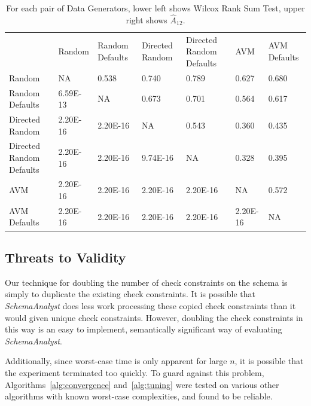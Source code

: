 \begin{table}[h]
\begin{tabular}{lllllll}
                         & Random   & Random Defaults & Directed Random & Directed Random Defaults & AVM      & AVM Defaults \\
Random                   & NA       & 0.538
&\cellcolor{gray!65} 0.740           &\cellcolor{gray!65} 0.789
&\cellcolor{gray!25} 0.627    &\cellcolor{gray!45} 0.680        \\
Random Defaults          & 6.59E-13 & NA              &
\cellcolor{gray!45}0.673           &\cellcolor{gray!45} 0.701
&\cellcolor{gray!25} 0.564    & \cellcolor{gray!25}0.617        \\
Directed Random          & 2.20E-16 & 2.20E-16        & NA
& 0.543                    &\cellcolor{gray!25} 0.360    &\cellcolor{gray!25} 0.435        \\
Directed Random Defaults & 2.20E-16 & 2.20E-16        & 9.74E-16
& NA                       &\cellcolor{gray!45} 0.328    &\cellcolor{gray!25} 0.395        \\
AVM                      & 2.20E-16 & 2.20E-16        & 2.20E-16
& 2.20E-16                 & NA       &\cellcolor{gray!25} 0.572        \\
AVM Defaults             & 2.20E-16 & 2.20E-16        & 2.20E-16        & 2.20E-16                 & 2.20E-16 & NA          
\end{tabular}
\caption{For each pair of Data Generators, lower left shows Wilcox Rank
Sum Test, upper right shows $\hat{A}_{12}$.}
\label{tab:datas}
\end{table}


\subsection*{Threats to Validity}

Our technique for doubling the number of check constraints on the schema
is simply to duplicate the existing check constraints. It is possible
that \textit{SchemaAnalyst} does less work processing these copied check
constraints than it would given unique check constraints. However,
doubling the check constraints in this way is an easy to implement,
semantically significant way of evaluating \textit{SchemaAnalyst}.

Additionally, since worst-case time is only apparent for large $n$, 
it is possible that the experiment terminated too quickly.  To guard 
against this problem, Algorithms~\ref{alg:convergence} and~\ref{alg:tuning}
were tested on various other algorithms with known worst-case complexities, and 
found to be reliable.
